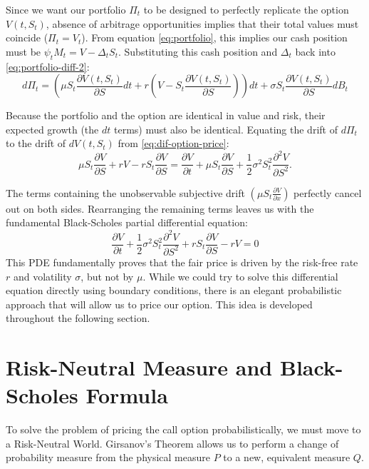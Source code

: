 \documentclass{article}
\theoremstyle{definition}
\theoremstyle{remark}
\begin{document}
Since we want our portfolio $\Pi_t$ to be designed to perfectly replicate the option $V(t,S_t)$, absence of arbitrage opportunities implies that their total values must coincide ($\Pi_t = V_t$). From equation \eqref{eq:portfolio}, this implies our cash position must be $\psi_t M_t = V - \Delta_t S_t$. Substituting this cash position and $\Delta_t$ back into \eqref{eq:portfolio-diff-2}:
\[
d\Pi_t = \left( \mu S_t \frac{\partial V(t,S_t)}{\partial S}dt + r\left(V - S_t \frac{\partial V(t,S_t)}{\partial S}\right) \right) dt + \sigma S_t \frac{\partial V(t,S_t)}{\partial S} dB_t
\]

Because the portfolio and the option are identical in value and risk, their expected growth (the $dt$ terms) must also be identical. Equating the drift of $d\Pi_t$ to the drift of $dV(t,S_t)$ from \eqref{eq:dif-option-price}:
\[
\mu S_t \frac{\partial V}{\partial S} + r V - r S_t \frac{\partial V}{\partial S} = \frac{\partial V}{\partial t} + \mu S_t \frac{\partial V}{\partial S} + \frac{1}{2}\sigma^2 S_t^2 \frac{\partial^2 V}{\partial S^2}.
\]

The terms containing the unobservable subjective drift $\left(\mu S_t \frac{\partial V}{\partial x}\right)$ perfectly cancel out on both sides. Rearranging the remaining terms leaves us with the fundamental Black-Scholes partial differential equation:
\[
\frac{\partial V}{\partial t} + \frac{1}{2}\sigma^2 S_t^2 \frac{\partial^2 V}{\partial S^2} + r S_t \frac{\partial V}{\partial S} - r V = 0
\]
This PDE fundamentally proves that the fair price is driven by the risk-free rate $r$ and volatility $\sigma$, but not by $\mu$. While we could try to solve this differential equation directly using boundary conditions, there is an elegant probabilistic approach that will allow us to price our option. This idea is developed throughout the following section.

\section{Risk-Neutral Measure and Black-Scholes Formula}    
To solve the problem of pricing the call option probabilistically, we must move to a Risk-Neutral World. Girsanov's Theorem allows us to perform a change of probability measure from the physical measure $P$ to a new, equivalent measure $Q$. 
\end{document}
